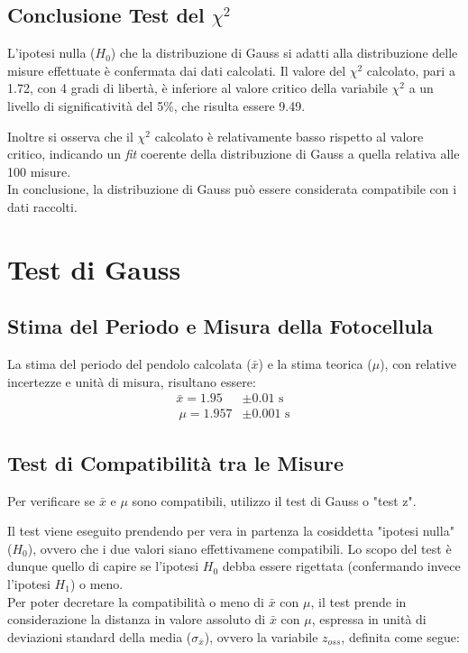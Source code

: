 \documentclass{article}
\begin{document}
\newpage

\subsection{Conclusione Test del $\chi^2$}
L'ipotesi nulla ($H_0$) che la distribuzione di Gauss si adatti alla distribuzione delle misure effettuate è confermata dai dati calcolati. Il valore del $\chi^2$ calcolato, pari a 1.72, con 4 gradi di libertà, è inferiore al valore critico della variabile $\chi^2$ a un livello di significatività del 5\%, che risulta essere 9.49.

Inoltre si osserva che il $\chi^2$ calcolato è relativamente basso rispetto al valore critico, indicando un \textit{fit} coerente della distribuzione di Gauss a quella relativa alle 100 misure. 
\\In conclusione, la distribuzione di Gauss può essere considerata compatibile con i dati raccolti.

\section{Test di Gauss}
\subsection{Stima del Periodo e Misura della Fotocellula}

La stima del periodo del pendolo calcolata ($\bar{x}$) e la stima teorica ($\mu$), con relative incertezze e unità di misura, risultano essere:
\begin{align*}
	\bar{x} = 1.95 &\pm 0.01\text{ s}\\ \
	\mu      = 1.957 &\pm 0.001 \text{ s} \
\end{align*}

\subsection{Test di Compatibilità tra le Misure}
Per verificare se $\bar{x}$ e $\mu$ sono compatibili, utilizzo il test di Gauss o "test z".

Il test viene eseguito prendendo per vera in partenza la cosiddetta "ipotesi nulla" ($H_0$), ovvero che i due valori siano effettivamene compatibili. Lo scopo del test è dunque quello di capire se l'ipotesi $H_0$ debba essere rigettata (confermando invece l'ipotesi $H_1$) o meno. \\

Per poter decretare la compatibilità o meno di $\bar{x}$ con $\mu$, il test prende in considerazione la distanza in valore assoluto di $\bar{x}$ con $\mu$, espressa in unità di deviazioni standard della media ($\sigma_{\bar{x}}$), ovvero la variabile $z_{oss}$, definita come segue: 
\end{document}
